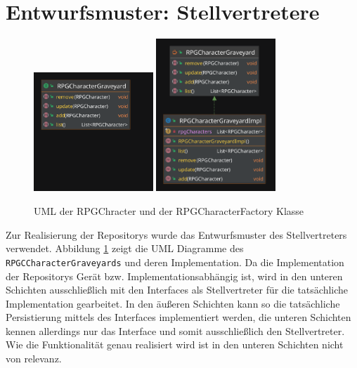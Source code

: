 \section{Entwurfsmuster:  Stellvertretere}
\begin{figure}[H]
	\centering
	\includegraphics[width=0.4\textwidth]{Bilder/RPGCharacterGraveyard.pdf}
	\includegraphics[width=0.4\textwidth]{Bilder/RPGCharacterGraveyardImpl.pdf}
	\caption{UML der RPGChracter und der RPGCharacterFactory Klasse}
	\label{fig:Stellvertreter}
\end{figure}
Zur Realisierung der Repositorys wurde das Entwurfsmuster des Stellvertreters verwendet. Abbildung \ref{fig:Stellvertreter} zeigt die UML Diagramme des \texttt{RPGCCharacterGraveyards} und deren Implementation. Da die Implementation der Repositorys Gerät bzw. Implementationsabhängig ist, wird in den unteren Schichten ausschließlich mit den Interfaces als Stellvertreter für die tatsächliche Implementation gearbeitet. In den äußeren Schichten kann so die tatsächliche Persistierung mittels des Interfaces implementiert werden, die unteren Schichten kennen allerdings nur das Interface und somit ausschließlich den Stellvertreter. Wie die Funktionalität genau realisiert wird ist in den unteren Schichten nicht von relevanz.
